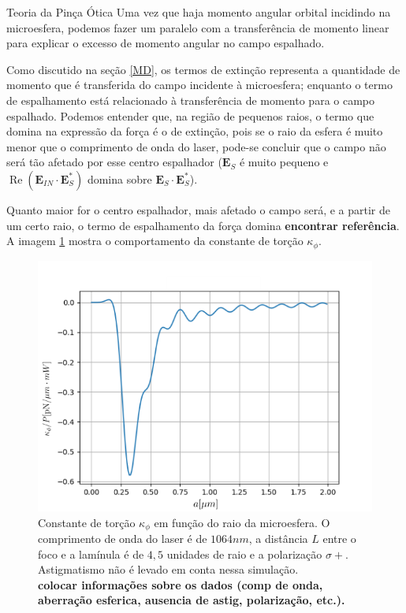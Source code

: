 \begin{chapter}{Teoria da Pinça Ótica}
Uma vez que haja momento angular orbital incidindo na microesfera, podemos fazer um paralelo com a transferência de momento linear para explicar o excesso de momento angular no campo espalhado.

Como discutido na seção \ref{MD}, os termos de extinção representa a quantidade de momento que é transferida do campo incidente à microesfera; enquanto o termo de espalhamento está relacionado à transferência de momento para o campo espalhado. Podemos entender que, na região de pequenos raios, o termo que domina na expressão da força é o de extinção, pois se o raio da esfera é muito menor que o comprimento de onda do laser, pode-se concluir que o campo não será tão afetado por esse centro espalhador (${\mathbf E}_S$ é muito pequeno e $\operatorname{Re}({\mathbf E}_{IN}\cdot{\mathbf E}_S^*)$ domina sobre ${\mathbf E}_S\cdot{\mathbf E}_S^*$). 

Quanto maior for o centro espalhador, mais afetado o campo será, e a partir de um certo raio, o termo de espalhamento da força domina \cite{}{\bf encontrar referência}. A imagem \ref{Kphi_raio} mostra o comportamento da constante de torção $\kappa_\phi$.
%
\begin{figure}[h]
\begin{center}
\includegraphics[scale=.85]{Kphi_Artigo_Kaina}
\caption{Constante de torção $\kappa_\phi$ em função do raio da microesfera. O comprimento de onda do laser é de $1064 nm$, a distância $L$ entre o foco e a lamínula é de $4,5$ unidades de raio e a polarização $\sigma+$. Astigmatismo não é levado em conta nessa simulação.\\{\bf colocar informações sobre os dados (comp de onda, aberração esferica, ausencia de astig, polarização, etc.).}}
\label{Kphi_raio}
\end{center}
\end{figure}
%


\end{chapter}
